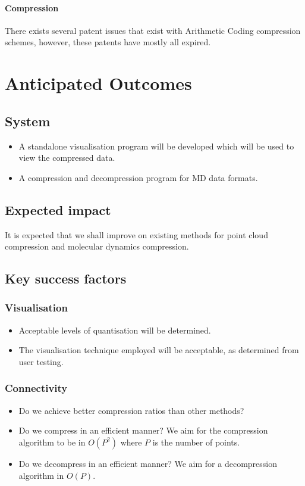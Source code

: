 \documentclass[a4paper,twocolumn]{article}
\begin{document}
\paragraph{Compression} There exists several patent issues that exist with
Arithmetic Coding compression schemes, however, these patents have mostly all
expired.


\section{Anticipated Outcomes}

\subsection{System}
\begin{itemize}
\item A standalone visualisation program will be developed which will be used
  to view the compressed data.
\item A compression and decompression program for MD data formats.
\end{itemize}

\subsection{Expected impact}
It is expected that we shall improve on existing methods for point cloud
compression and molecular dynamics compression.

\subsection{Key success factors}

\subsubsection*{Visualisation}
\begin{itemize}
\item Acceptable levels of quantisation will be determined.
\item The visualisation technique employed will be acceptable, as determined from user testing.
\end{itemize}

\subsubsection*{Connectivity}
\begin{itemize}
\item Do we achieve better compression ratios than other methods?
\item Do we compress in an efficient manner? We aim for the compression
  algorithm to be in $O(P^2)$ where $P$ is the number of points.
\item Do we decompress in an efficient manner? We aim for a decompression
  algorithm in $O(P)$.
\end{itemize}
\end{document}
